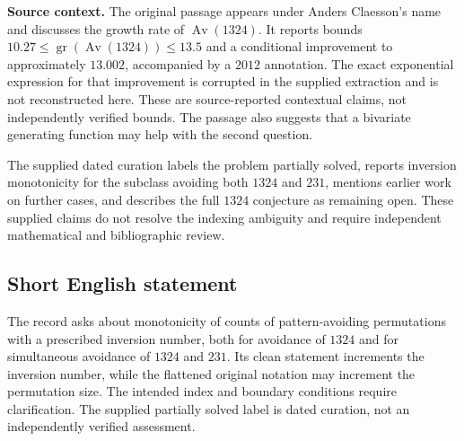 \documentclass[11pt]{article}
\begin{document}
\textbf{Source context.} The original passage appears under Anders Claesson's name and discusses the growth rate of \(\operatorname{Av}(1324)\). It reports bounds \(10.27\le \operatorname{gr}(\operatorname{Av}(1324))\le13.5\) and a conditional improvement to approximately \(13.002\), accompanied by a \(2012\) annotation. The exact exponential expression for that improvement is corrupted in the supplied extraction and is not reconstructed here. These are source-reported contextual claims, not independently verified bounds. The passage also suggests that a bivariate generating function may help with the second question.

The supplied dated curation labels the problem partially solved, reports inversion monotonicity for the subclass avoiding both \(1324\) and \(231\), mentions earlier work on further cases, and describes the full \(1324\) conjecture as remaining open. These supplied claims do not resolve the indexing ambiguity and require independent mathematical and bibliographic review.
\subsection{Short English statement}
The record asks about monotonicity of counts of pattern-avoiding permutations with a prescribed inversion number, both for avoidance of \(1324\) and for simultaneous avoidance of \(1324\) and \(231\). Its clean statement increments the inversion number, while the flattened original notation may increment the permutation size. The intended index and boundary conditions require clarification. The supplied partially solved label is dated curation, not an independently verified assessment.
\end{document}
